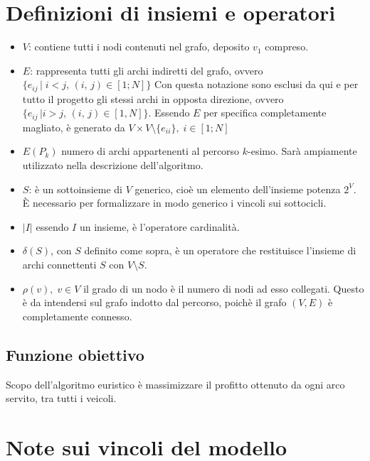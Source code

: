 \section{Definizioni di insiemi e operatori}
\begin{itemize}
  \item $V$: contiene tutti i nodi contenuti nel grafo, deposito $v_1$ compreso.
  \item $E$: rappresenta tutti gli archi indiretti del grafo, ovvero $\{e_{ij}\,|\;i<j,\,(i,\,j)\in [1;N] \}$
  		Con questa notazione sono esclusi da qui e per tutto il progetto gli stessi archi in opposta direzione,
  		ovvero $\{e_{ij}\,|i>j,\,(i,\,j)\in [1,N] \}$.
  		Essendo $E$ per specifica completamente magliato, è generato da $V\times V \setminus \{e_{ii}\},\; i\in[1;N]$ 
  \item $E(P_k)$ numero di archi appartenenti al percorso $k$-esimo. Sarà ampiamente utilizzato nella descrizione dell'algoritmo.
  \item $S$: è un sottoinsieme di $V$ generico, cioè un elemento dell'insieme potenza $2^V$. 
 		È necessario per formalizzare in modo generico i vincoli sui sottocicli. 
  \item $|I|$ essendo $I$ un insieme, è l'operatore cardinalità.
  \item $\delta(S)$, con $S$ definito come sopra, è un operatore che restituisce l'insieme di archi connettenti $S$ con $V\setminus S$.
  \item $\rho(v),\; v\in V$ il grado di un nodo è il numero di nodi ad esso collegati. Questo è da intendersi sul grafo indotto dal percorso,
  		poichè il grafo $(V,E)$ è completamente connesso.
\end{itemize}

\subsection{Funzione obiettivo}
	Scopo dell'algoritmo euristico è massimizzare il profitto ottenuto da ogni arco servito, tra tutti i veicoli. 
\section{Note sui vincoli del modello}
